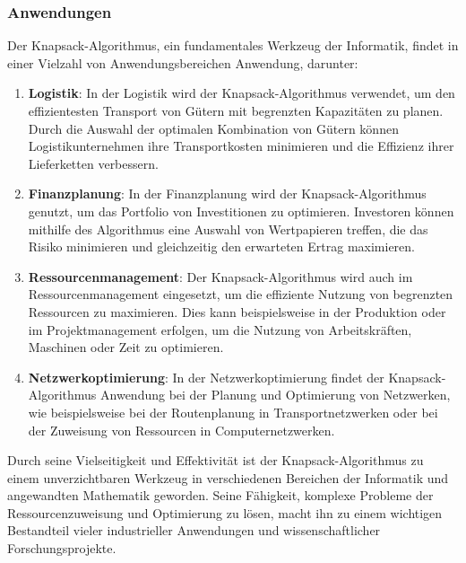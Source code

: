 \subsubsection*{Anwendungen} %
Der Knapsack-Algorithmus, ein fundamentales Werkzeug der Informatik, findet in einer Vielzahl von Anwendungsbereichen
Anwendung, darunter:

\begin{enumerate}
    \item \textbf{Logistik}: In der Logistik wird der Knapsack-Algorithmus verwendet, um den effizientesten Transport von Gütern
    mit begrenzten Kapazitäten zu planen. Durch die Auswahl der optimalen Kombination von Gütern können Logistikunternehmen
    ihre Transportkosten minimieren und die Effizienz ihrer Lieferketten verbessern.
    \item \textbf{Finanzplanung}: In der Finanzplanung wird der Knapsack-Algorithmus genutzt, um das Portfolio von Investitionen
    zu optimieren. Investoren können mithilfe des Algorithmus eine Auswahl von Wertpapieren treffen, die das Risiko minimieren
    und gleichzeitig den erwarteten Ertrag maximieren.
    \item \textbf{Ressourcenmanagement}: Der Knapsack-Algorithmus wird auch im Ressourcenmanagement eingesetzt, um die effiziente
    Nutzung von begrenzten Ressourcen zu maximieren. Dies kann beispielsweise in der Produktion oder im Projektmanagement
    erfolgen, um die Nutzung von Arbeitskräften, Maschinen oder Zeit zu optimieren.
    \item \textbf{Netzwerkoptimierung}: In der Netzwerkoptimierung findet der Knapsack-Algorithmus Anwendung bei der Planung
    und Optimierung von Netzwerken, wie beispielsweise bei der Routenplanung in Transportnetzwerken oder bei der Zuweisung
    von Ressourcen in Computernetzwerken.
\end{enumerate}

Durch seine Vielseitigkeit und Effektivität ist der Knapsack-Algorithmus zu einem unverzichtbaren Werkzeug in verschiedenen
Bereichen der Informatik und angewandten Mathematik geworden. Seine Fähigkeit, komplexe Probleme der Ressourcenzuweisung
und Optimierung zu lösen, macht ihn zu einem wichtigen Bestandteil vieler industrieller Anwendungen und wissenschaftlicher
Forschungsprojekte.

